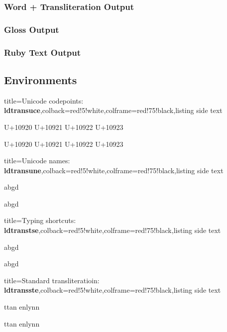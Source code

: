 \documentclass{article}
\newcommand\bqq[1]{\begin{quotation}#1\end{quotation}}
\begin{document}
\subsubsection{Word + Transliteration Output}
\bqq{}

\subsubsection{Gloss Output}
\bqq{}
\bqq{}

\subsubsection{Ruby Text Output}
\bqq{}

\subsection{Environments}

\bigskip
\begin{tcblisting}{title={{\sffamily Unicode codepoints: \bfseries\textcolor{blue!10}{ldtransuce}}},colback=red!5!white,colframe=red!75!black,listing side text}
\begin{ldtransuce}
U+10920 U+10921 U+10922 U+10923

U+10920 U+10921 U+10922 U+10923
\end{ldtransuce}
\end{tcblisting}

\bigskip
\begin{tcblisting}{title={{\sffamily Unicode names: \bfseries\textcolor{blue!10}{ldtransune}}},colback=red!5!white,colframe=red!75!black,listing side text}
\begin{ldtransune}
abgd

abgd
\end{ldtransune}
\end{tcblisting}

\bigskip
\begin{tcblisting}{title={{\sffamily Typing shortcuts: \bfseries\textcolor{blue!10}{ldtranstse}}},colback=red!5!white,colframe=red!75!black,listing side text}
\begin{ldtranstse}
abgd

abgd
\end{ldtranstse}
\end{tcblisting}

\bigskip
\begin{tcblisting}{title={{\sffamily Standard transliteratioin: \bfseries\textcolor{blue!10}{ldtransste}}},colback=red!5!white,colframe=red!75!black,listing side text}
\begin{ldtransste}
ttan enlynn

ttan enlynn
\end{ldtransste}
\end{tcblisting}
\end{document}
